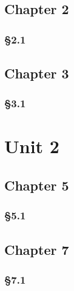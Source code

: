 \subsection{Chapter 2}
\subsubsection{§2.1}


\subsection{Chapter 3}

\subsubsection{§3.1}

\section{Unit 2}
\subsection{Chapter 5}
\subsubsection{§5.1}

\subsection{Chapter 7}
\subsubsection{§7.1}

